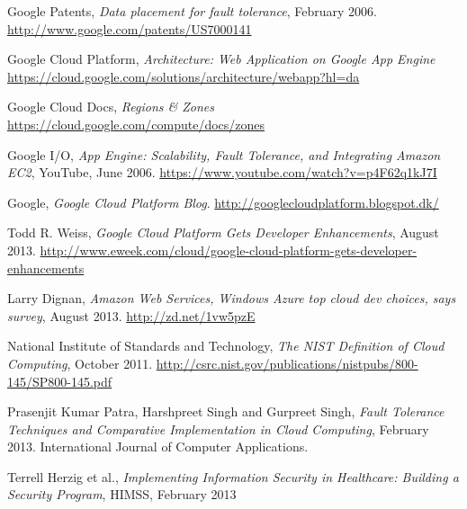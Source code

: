 \documentclass[11pt]{report}
\begin{document}
\begin{thebibliography}{99}
	Google Patents, \emph{Data placement for fault tolerance}, February 2006.
	\url{http://www.google.com/patents/US7000141}
	
	Google Cloud Platform, \emph{Architecture: Web Application on Google App Engine}
	\url{https://cloud.google.com/solutions/architecture/webapp?hl=da}
	
\bibitem{}
	Google Cloud Docs, \emph{Regions \& Zones}
	\url{https://cloud.google.com/compute/docs/zones}
	
	Google I/O, \emph{App Engine: Scalability, Fault Tolerance, and Integrating Amazon EC2}, YouTube, June 2006.
	\url{https://www.youtube.com/watch?v=p4F62q1kJ7I}
	
	Google, \emph{Google Cloud Platform Blog}.
	\url{http://googlecloudplatform.blogspot.dk/}
	
	Todd R. Weiss, \emph{Google Cloud Platform Gets Developer Enhancements}, August 2013.
	\url{http://www.eweek.com/cloud/google-cloud-platform-gets-developer-enhancements}
	
	Larry Dignan, \emph{Amazon Web Services, Windows Azure top cloud dev choices, says survey}, August 2013.
	\url{http://zd.net/1vw5pzE}
	
	National Institute of Standards and Technology, \emph{The NIST Definition of Cloud Computing}, October 2011.
	\url{http://csrc.nist.gov/publications/nistpubs/800-145/SP800-145.pdf}
	
	Prasenjit Kumar Patra, Harshpreet Singh and Gurpreet Singh, \emph{Fault Tolerance Techniques and Comparative Implementation in Cloud Computing}, February 2013.
	International Journal of Computer Applications.
	
	Terrell Herzig et al., \emph{Implementing Information Security in Healthcare: Building a Security Program}, HIMSS, February 2013

\end{thebibliography}
\end{document}
